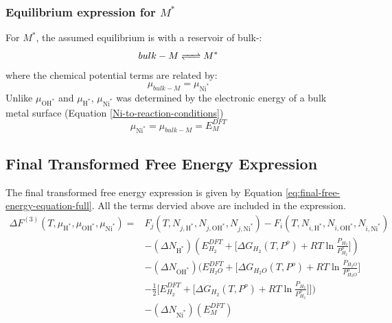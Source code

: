\documentclass[12pt]{article}
\begin{document}
\subsubsection{Equilibrium expression for $M^{*}$}
For $M^{*}$, the assumed equilibrium is with a reservoir of bulk-:
\begin{equation}
    bulk-M \ce{<=>} M^{*}
\end{equation}
where the chemical potential terms are related by: 
\begin{equation}
    \mu_{bulk-M} = \mu_{\text{Ni}^{*}}
\end{equation}
Unlike $\mu_{\text{OH}^{*}}$ and $\mu_{\text{H}^{*}}$, $\mu_{\text{Ni}^{*}}$ was determined by the  electronic energy of a bulk metal surface (Equation \ref{Ni-to-reaction-conditions})
\begin{equation}
    \mu_{\text{Ni}^{*}} = \mu_{bulk-M} = E_{M}^{DFT}
    \label{Ni-to-reaction-conditions}
\end{equation}

\subsection{Final Transformed Free Energy Expression}
The final transformed free energy expression is given by Equation \ref{eq:final-free-energy-equation-full}. All the terms dervied above are included in the expression. 
\begin{equation}
    \begin{split}
        \Delta F^{(3)}(T,\mu_{\text{H}^{*}},\mu_{\text{OH}^{*}},\mu_{\text{Ni}^{*}})  = 
        & F_{j}(T,N_{j,\text{H}^{*}},N_{j,\text{OH}^{*}},N_{j,\text{Ni}^{*}}) - 
          F_{i}(T,N_{i,\text{H}^{*}},N_{i,\text{OH}^{*}},N_{i,\text{Ni}^{*}}) \\
        & - (\Delta N_{\text{H}^{*}}) (E_{H_{2}}^{DFT} + \Big[ \Delta G_{H_{2}}(T,P^{o})  + RT \ln{ \frac{P_{H_2}}{P_{H_2}^{o}}} \Big])  \\
        & - (\Delta N_{\text{OH}^{*}}) \Big( E_{H_{2}O}^{DFT} + \Big[ \Delta G_{H_{2}O}(T,P^{o})  + RT \ln{ \frac{P_{H_{2}O}}{P_{H_{2}O}^{o}}} \Big] \\ 
        & - \frac{1}{2} \Big[ E_{H_{2}}^{DFT} + \big[ \Delta G_{H_{2}}(T,P^{o})  + RT \ln{ \frac{P_{H_2}}{P_{H_2}^{o}}} \big] \Big] \Big) \\
        & - (\Delta N_{\text{Ni}^{*}}) (E_{M}^{DFT}) \\ 
    \end{split}
    \label{eq:final-free-energy-equation-full}
\end{equation}
\end{document}
